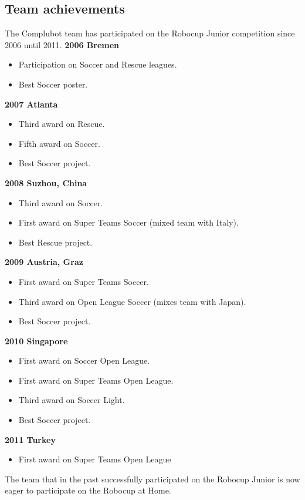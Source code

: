 %
\subsection{Team achievements}
The Complubot team has participated on the Robocup Junior competition since 2006 until 2011.
\newline\textbf{2006 Bremen}
\begin{itemize}[nosep]
  \item Participation on Soccer and Rescue leagues.
  \item Best Soccer poster.
\end{itemize}
\textbf{2007 Atlanta}
\begin{itemize}[nosep]
  \item Third award on Rescue.
  \item Fifth award on Soccer.
  \item Best Soccer project.
\end{itemize}
\textbf{2008 Suzhou, China}
\begin{itemize}[nosep]
  \item Third award on Soccer.
  \item First award on Super Teams Soccer (mixed team with Italy).
  \item Best Rescue project.
\end{itemize}
\textbf{2009 Austria, Graz}
\begin{itemize}[nosep]
  \item First award on Super Teams Soccer.
  \item Third award on Open League Soccer (mixes team with Japan).
  \item Best Soccer project.
\end{itemize}
\textbf{2010 Singapore}
\begin{itemize}[nosep]
  \item First award on Soccer Open League.
  \item First award on Super Teams Open League.
  \item Third award on Soccer Light.
  \item Best Soccer project.
\end{itemize}
\textbf{2011 Turkey}
\begin{itemize}[nosep]
  \item First award on Super Teams Open League
\end{itemize}
The team that in the past successfully participated on the Robocup Junior is now eager to participate on the Robocup at Home.

